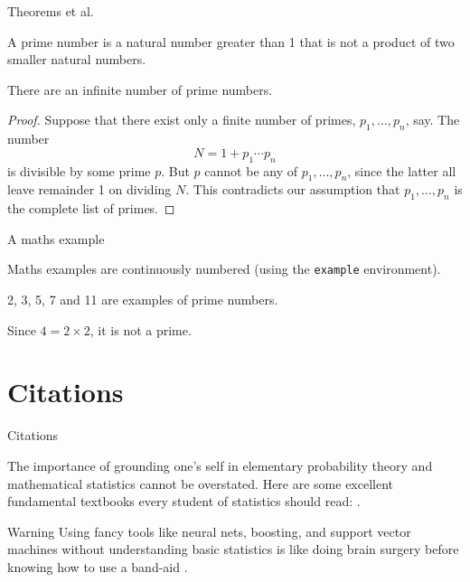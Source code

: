 \documentclass[]{beamer}
\begin{document}
\begin{frame}{Theorems et al.}

	\begin{definition}
		A prime number is a natural number greater than 1 that is not a product of two smaller natural numbers.
	\end{definition}
	
	\begin{theorem}
		There are an infinite number of prime numbers.
	\end{theorem}
	
	\begin{proof}
		Suppose that there exist only a finite number of primes, $p_1,\dots,p_n$, say.
		The number 
		\[
		  N = 1+p_1\cdots p_n
		\]
		is divisible by some prime $p$.
		But $p$ cannot be any of $p_1,\dots,p_n$, since the latter all leave remainder 1 on dividing $N$.
		This contradicts our assumption that $p_1,\dots,p_n$ is the complete list of primes.
	\end{proof}

\end{frame}

\begin{frame}{A maths example}

	Maths examples are continuously numbered (using the \texttt{example} environment).
	
	\begin{example}
		2, 3, 5, 7 and 11 are examples of prime numbers.
	\end{example}

	\begin{example}
		Since $4 = 2 \times 2$, it is not a prime.
	\end{example}

\end{frame}

\section{Citations}

\begin{frame}{Citations}

	
	The importance of grounding one's self in elementary probability theory and mathematical statistics cannot be overstated.
	Here are some excellent fundamental textbooks every student of statistics should read: \citet{casella2002statistical,	pawitan2001all, wasserman2013all}.\\[1em]
	
	\begin{alertblock}{Warning}
		Using fancy tools like neural nets, boosting, and support vector machines without understanding basic statistics is like doing brain surgery before knowing how to use a band-aid \citep{wasserman2013all}.
	\end{alertblock}

\end{frame}
\end{document}
